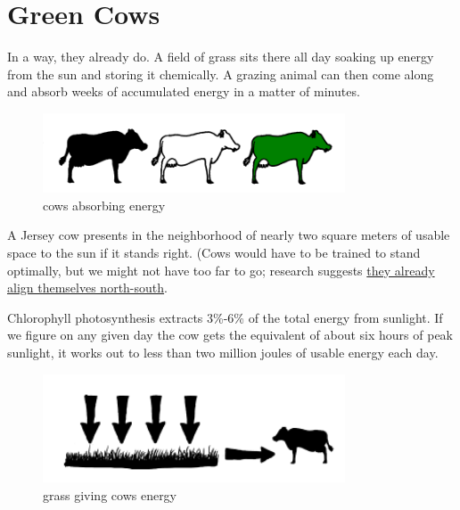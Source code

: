 {
\chapter{Green Cows}
}

\hfill{}

{In a way, they already do. A field of grass sits there all day soaking up energy from the sun and storing it chemically. A grazing animal can then come along and absorb weeks of accumulated energy in a matter of minutes.}

\begin{figure}[!htbp]
\centering
\includegraphics[scale=0.5, max width=0.8\textwidth]{imgs/a/17/01.png}
\caption{cows absorbing energy}
\end{figure}

{A Jersey cow presents in the neighborhood of nearly two square meters of usable space to the sun if it stands right. (Cows would have to be trained to stand optimally, but we might not have too far to go; research suggests \href{http://www.pnas.org/content/early/2008/08/22/0803650105}{they already align themselves north-south}.}

{Chlorophyll photosynthesis extracts 3\%-6\% of the total energy from sunlight. If we figure on any given day the cow gets the equivalent of about six hours of peak sunlight, it works out to less than two million joules of usable energy each day.}

\begin{figure}[!htbp]
\centering
\includegraphics[scale=0.5, max width=0.8\textwidth]{imgs/a/17/02.png}
\caption{grass giving cows energy}
\end{figure}


